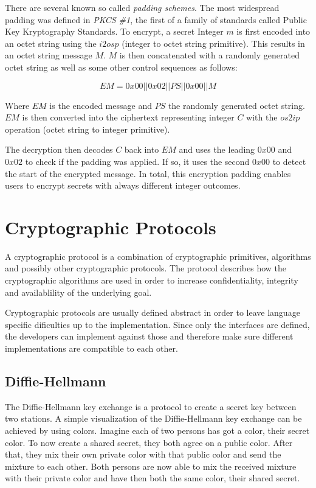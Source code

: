 There are several known so called \textit{padding schemes}. The most widespread
padding was defined in \textit{PKCS \#1}, the first of a family of standards
called Public Key Kryptography Standards. To encrypt, a secret Integer $m$ is 
first encoded into an octet string using the $i2osp$ (integer to octet string 
primitive). This results in an octet string message $M$. $M$ is then
concatenated with a randomly generated octet string as well as some other control
sequences as follows:

$$EM = 0x00 || 0x02 || PS || 0x00 || M$$

Where $EM$ is the encoded message and $PS$ the randomly generated octet string.
$EM$ is then converted into the ciphertext representing integer $C$ with the $os2ip$
operation (octet string to integer primitive).

The decryption then decodes $C$ back into $EM$ and 
uses the leading $0x00$ and $0x02$ to check if the padding was
applied. If so, it uses the second $0x00$ to detect the start of the encrypted
message. In total, this encryption padding enables users to encrypt secrets with
always different integer outcomes.

\section{Cryptographic Protocols}

A cryptographic protocol is a combination of cryptographic primitives,
algorithms and possibly other cryptographic protocols. The protocol describes
how the cryptographic algorithms are used in order to increase confidentiality,
integrity and availablility of the underlying goal.

Cryptographic protocols are usually defined abstract in order to leave language
specific dificulties up to the implementation. Since only the interfaces are
defined, the developers can implement against those and therefore make sure
different implementations are compatible to each other.

\subsection{Diffie-Hellmann}

The Diffie-Hellmann key exchange is a protocol to create a secret key between
two stations. A simple visualization of the Diffie-Hellmann key exchange can
be achieved by using colors. Imagine each of two persons has got a color,
their secret color. To now create a shared secret, they both agree on a
public color. After that, they mix their own private color with that public
color and send the mixture to each other. Both persons are now able to mix
the received mixture with their private color and have then both the same
color, their shared secret.

